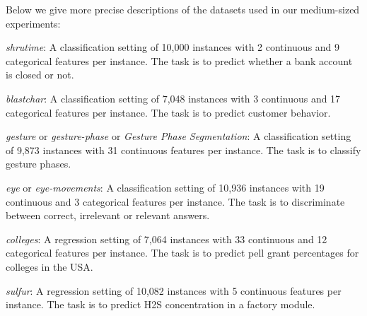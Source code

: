 \documentclass{article}
\theoremstyle{plain}
\theoremstyle{definition}
\theoremstyle{remark}
\begin{document}
Below we give more precise descriptions of the datasets used in our medium-sized experiments:
\begin{description}[topsep=-1.5pt,itemsep=1.5pt]
     \item {\em shrutime}: A classification setting of 10,000 instances with 2 continuous and 9 categorical features per instance. The task is to predict whether a bank account is closed or not.
    
    \item {\em blastchar}: A classification setting of 7,048 instances with 3 continuous and 17 categorical features per instance. The task is to predict customer behavior.
    
    \item {\em gesture} or {\em gesture-phase} or {\em Gesture Phase Segmentation}: A classification setting of 9,873 instances with 31 continuous features per instance. The task is to classify gesture phases.
    
    \item {\em eye} or {\em eye-movements}: A classification setting of 10,936 instances with 19 continuous and 3 categorical features per instance. The task is to discriminate between correct, irrelevant or relevant answers.
    
    \item {\em colleges}: A regression setting of 7,064 instances with 33 continuous and
    12 categorical features per instance. The task is to predict pell grant percentages
    for colleges in the USA.
     
    \item {\em sulfur}: A regression setting of 10,082 instances with 5 continuous features
    per instance. The task is to predict H2S concentration in a factory module.
\end{description}
\end{document}
